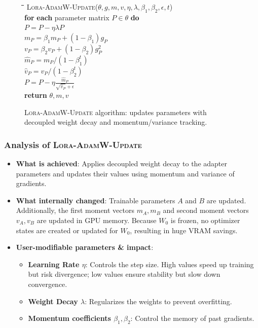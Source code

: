 \documentclass{article}
\begin{document}
\vspace{1.5em}

\begin{figure}[h]
\centering
\begin{minipage}{0.8\linewidth}
\begin{tabbing}
\quad \= \quad \= \quad \= \quad \= \kill
\textsc{Lora-AdamW-Update}($\theta, g, m, v, \eta, \lambda, \beta_1, \beta_2, \epsilon, t$) \\
\> \textbf{for} \textbf{each} parameter matrix $P \in \theta$ \textbf{do} \\
\> \> $P = P - \eta \lambda P$ \\
\> \> $m_P = \beta_1 m_P + (1 - \beta_1) g_P$ \\
\> \> $v_P = \beta_2 v_P + (1 - \beta_2) g_P^2$ \\
\> \> $\hat{m}_P = m_P / (1 - \beta_1^t)$ \\
\> \> $\hat{v}_P = v_P / (1 - \beta_2^t)$ \\
\> \> $P = P - \eta \frac{\hat{m}_P}{\sqrt{\hat{v}_P} + \epsilon}$ \\
\> \textbf{return} $\theta, m, v$
\end{tabbing}
\end{minipage}
\caption{\textsc{Lora-AdamW-Update} algorithm: updates parameters with decoupled weight decay and momentum/variance tracking.}
\end{figure}

\subsubsection{Analysis of \textsc{Lora-AdamW-Update}}
\begin{itemize}
  \item \textbf{What is achieved}: Applies decoupled weight decay to the adapter parameters and updates their values using momentum and variance of gradients.
  \item \textbf{What internally changed}: Trainable parameters $A$ and $B$ are updated. Additionally, the first moment vectors $m_A, m_B$ and second moment vectors $v_A, v_B$ are updated in GPU memory. Because $W_0$ is frozen, no optimizer states are created or updated for $W_0$, resulting in huge VRAM savings.
  \item \textbf{User-modifiable parameters \& impact}:
    \begin{itemize}
      \item \textbf{Learning Rate $\eta$}: Controls the step size. High values speed up training but risk divergence; low values ensure stability but slow down convergence.
      \item \textbf{Weight Decay $\lambda$}: Regularizes the weights to prevent overfitting.
      \item \textbf{Momentum coefficients $\beta_1, \beta_2$}: Control the memory of past gradients.
    \end{itemize}
\end{itemize}
\end{document}
